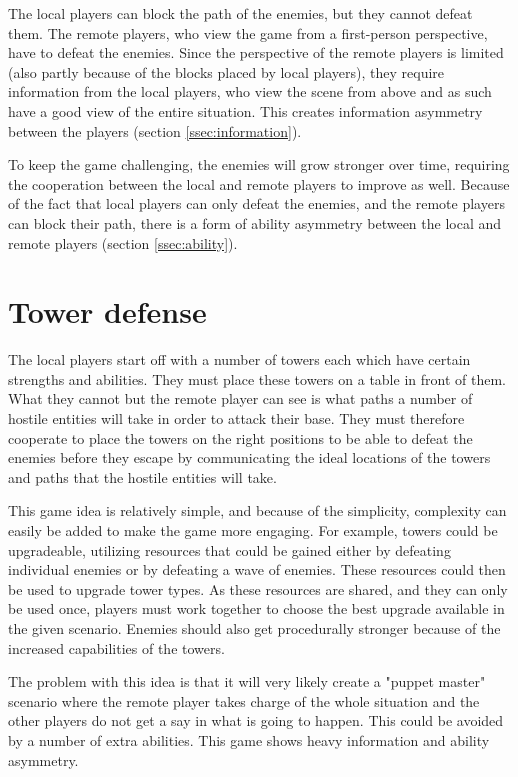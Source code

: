	The local players can block the path of the enemies, but they cannot defeat
	them. The remote players, who view the game from a first-person perspective,
	have to defeat the enemies. Since the perspective of the remote players is
	limited (also partly because of the blocks placed by local players), they
	require information from the local players, who view the scene from above
	and as such have a good view of the entire situation. This creates
	information asymmetry between the players (section \ref{ssec:information}).

	To keep the game challenging, the enemies will grow stronger over time,
	requiring the cooperation between the local and remote players to improve
	as well. Because of the fact that local players can only defeat the enemies,
	and the remote players can block their path, there is a form of ability
	asymmetry between the local and remote players (section \ref{ssec:ability}).

\section{Tower defense} \label{sec:towerdefense}
	The local players start off with a number of towers each
	which have certain strengths and abilities. They must place
	these towers on a table in front of them. What they cannot
	but the remote player can see is what paths a number of
	hostile entities will take in order to attack their base.
	They must therefore cooperate to place the towers on the right
	positions to be able to defeat the enemies before they escape
	by communicating the ideal locations of the
	towers and paths that the hostile entities will take.

	This game idea is relatively simple, and because of the simplicity,
	complexity can easily be added to make the game more engaging. For
	example, towers could be upgradeable, utilizing resources that
	could be gained either by defeating individual enemies or by defeating
	a wave of enemies. These resources could then be used to upgrade
	tower types. As these resources are shared, and they can only be
	used once, players must work together to choose the best upgrade
	available in the given scenario. Enemies should also get procedurally
	stronger because of the increased capabilities of the towers.

	The problem with this idea is that it will very likely create a
	"puppet master" scenario where the remote player takes charge
	of the whole situation and the other players do not get a
	say in what is going to happen. This could be avoided by a
	number of extra abilities. This game shows heavy
	information and ability asymmetry.

